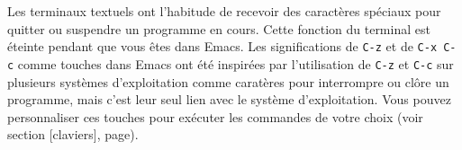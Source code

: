 Les terminaux textuels ont l'habitude de recevoir des caractères
spéciaux pour quitter ou suspendre un programme en cours. Cette
fonction du terminal est éteinte pendant que vous êtes dans Emacs. Les
significations de \texttt{C-z} et de \texttt{C-x C-c} comme touches
dans Emacs ont été inspirées par l'utilisation de \texttt{C-z} et
\texttt{C-c} sur plusieurs systèmes d'exploitation comme caratères
pour interrompre ou clôre un programme, mais c'est leur seul lien avec
le système d'exploitation. Vous pouvez personnaliser ces touches pour
exécuter les commandes de votre choix (voir
section [claviers],
page).\par 

